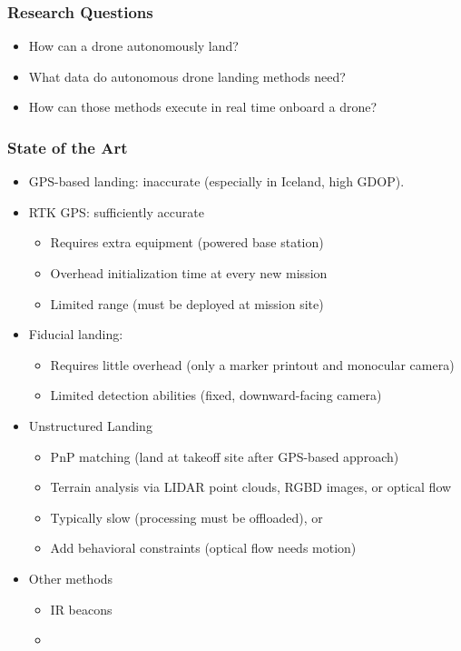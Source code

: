 \documentclass[aspectratio=169]{rubeamer}
\newif\ifpause
\newcommand{\mypause}{\ifpause \pause \fi}
\begin{document}
\begin{frame}
  \frametitle{Research Questions}
  \begin{itemize}
    \mypause
    \item How can a drone autonomously land?
    \mypause
    \item What data do autonomous drone landing methods need?
    \mypause
    \item How can those methods execute in real time onboard a drone?
  \end{itemize}
\end{frame}

\begin{frame}
  \frametitle{State of the Art}
  \begin{itemize}
    \item GPS-based landing: inaccurate (especially in Iceland, high GDOP).
    \mypause
    \item RTK GPS: sufficiently accurate
    \begin{itemize}
      \mypause
      \item Requires extra equipment (powered base station)
      \mypause
      \item Overhead initialization time at every new mission
      \mypause
      \item Limited range (must be deployed at mission site)
    \end{itemize}
    \mypause
    \item Fiducial landing:
    \begin{itemize}
      \mypause
      \item Requires little overhead (only a marker printout and monocular camera)
      \mypause
      \item Limited detection abilities (fixed, downward-facing camera)
    \end{itemize}
    \mypause
    \item Unstructured Landing
    \begin{itemize}
      \item PnP matching (land at takeoff site after GPS-based approach)
      \item Terrain analysis via LIDAR point clouds, RGBD images, or optical flow
      \item Typically slow (processing must be offloaded), or
      \item Add behavioral constraints (optical flow needs motion)
    \end{itemize}
    \mypause
    \item Other methods
    \begin{itemize}
      \item IR beacons
      \item
    \end{itemize}
  \end{itemize}

\end{frame}
\end{document}
